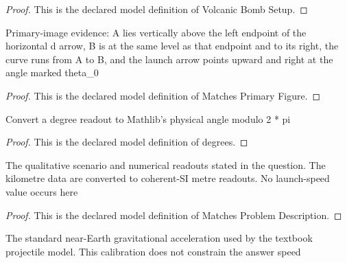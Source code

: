 \begin{proof}
  This is the declared model definition of Volcanic Bomb Setup.
\end{proof}
\begin{definition}
  \label{def:physics:phyx-mini-0752:phyxminiproblems-problemphyxmini0752-matchesprimaryfigure}
  Primary-image evidence: A lies vertically above the left endpoint of the horizontal d arrow, B is at the same level as that endpoint and to its right, the curve runs from A to B, and the launch arrow points upward and right at the angle marked theta\_0
\end{definition}
\begin{proof}
  This is the declared model definition of Matches Primary Figure.
\end{proof}
\begin{definition}[degrees]
  \label{def:physics:phyx-mini-0752:phyxminiproblems-problemphyxmini0752-degrees}
  Convert a degree readout to Mathlib's physical angle modulo 2 * pi
\end{definition}
\begin{proof}
  This is the declared model definition of degrees.
\end{proof}
\begin{definition}
  \label{def:physics:phyx-mini-0752:phyxminiproblems-problemphyxmini0752-matchesproblemdescription}
  The qualitative scenario and numerical readouts stated in the question. The kilometre data are converted to coherent-SI metre readouts. No launch-speed value occurs here
\end{definition}
\begin{proof}
  This is the declared model definition of Matches Problem Description.
\end{proof}
\begin{definition}
  \label{def:physics:phyx-mini-0752:phyxminiproblems-problemphyxmini0752-usesstandardnearearthgravity}
  The standard near-Earth gravitational acceleration used by the textbook projectile model. This calibration does not constrain the answer speed
\end{definition}
